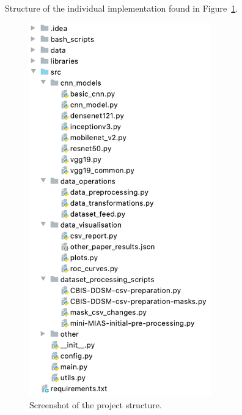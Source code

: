 Structure of the individual implementation  found in Figure~\ref{fig:appendix-project_structure}.

\begin{figure}[h]
\centerline{\includegraphics[width=0.70\textwidth]{figures/appendix/project_structure.png}}
\caption{\label{fig:appendix-project_structure}Screenshot of the project structure.}
\end{figure}
